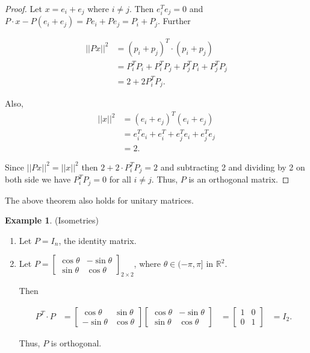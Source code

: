 \documentclass[12pt]{article}
\theoremstyle{definition}
\newtheorem*{example}{Example}
\begin{document}
\begin{proof}
Let $x = e_i + e_j$ where $i \neq j$. Then $e_i^T e_j = 0$ and
$P \cdot x - P(e_i + e_j) = Pe_i + Pe_j = P_i + P_j$. Further

\begin{align*}
||Px||^2 &= (p_i + p_j)^T \cdot (p_i + p_j) \\
&= P_i^T P_i + P_i^T P_j + P_j^T P_i + P_j^T P_j \\
&= 2 + 2P_i^T P_j.
\end{align*}

Also,
\begin{align*}
||x||^2 &= (e_i + e_j)^T (e_i + e_j) \\
&= e_i^T e_i + e_i^T + e_j^T e_i + e_j^T e_j \\
&= 2.
\end{align*}

Since $||Px||^2 = ||x||^2$ then $2 + 2 \cdot P_i^T P_j = 2$ and subtracting 2 and
dividing by 2 on both side we have $P_i^T P_j = 0$ for all $i \neq j$. Thus,
$P$ is an orthogonal matrix.
\end{proof}

The above theorem also holds for unitary matrices.

\begin{example} (Isometries)
\begin{enumerate}[label = (\arabic*)]
\item Let $P = I_n$, the identity matrix.
\item Let $P = \begin{bmatrix} \cos \theta & -\sin \theta \\ \sin\theta & \cos\theta \end{bmatrix}_{2 \times 2}$,
where $\theta \in (-\pi, \pi]$ in $\mathbb{R}^2$.

Then 

\begin{align*}
P^T \cdot P &= 
\begin{bmatrix}
\cos\theta & \sin\theta \\
-\sin\theta & \cos\theta
\end{bmatrix}
\begin{bmatrix}
\cos\theta & -\sin\theta \\
\sin\theta & \cos\theta
\end{bmatrix}
&=
\begin{bmatrix}
1 & 0 \\
0 & 1
\end{bmatrix}
&= I_2.
\end{align*}

Thus, $P$ is orthogonal.
\end{enumerate}
\end{example}
\end{document}
